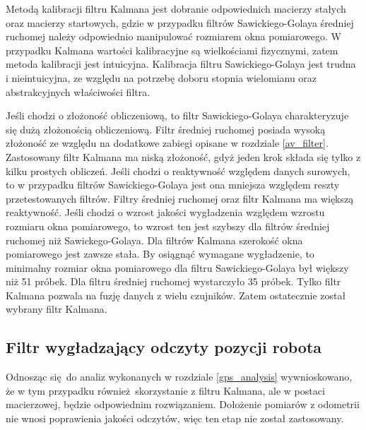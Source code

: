 {{        Metodą kalibracji filtru Kalmana jest dobranie odpowiednich macierzy stałych oraz macierzy startowych, gdzie w przypadku filtrów Sawickiego-Golaya średniej ruchomej należy odpowiednio manipulować rozmiarem okna pomiarowego. W przypadku Kalmana wartości kalibracyjne są wielkościami fizycznymi, zatem metoda kalibracji jest intuicyjna. Kalibracja filtru Sawickiego-Golaya jest trudna i nieintuicyjna, ze względu na potrzebę doboru stopnia wielomianu oraz abstrakcyjnych właściwości filtra.

        Jeśli chodzi o złożoność obliczeniową, to filtr Sawickiego-Golaya charakteryzuje się dużą złożonością obliczeniową. Filtr średniej ruchomej posiada wysoką złożoność ze względu na dodatkowe zabiegi opisane w rozdziale \ref{av_filter}. Zastosowany filtr Kalmana ma niską złożoność, gdyż jeden krok składa się tylko z kilku prostych obliczeń. 
        Jeśli chodzi o reaktywność względem danych surowych, to w przypadku filtrów Sawickiego-Golaya jest ona mniejsza względem reszty przetestowanych filtrów. Filtry średniej ruchomej oraz filtr Kalmana ma większą reaktywność. 
        Jeśli chodzi o wzrost jakości wygładzenia względem wzrostu rozmiaru okna pomiarowego, to wzrost ten jest szybszy dla filtrów średniej ruchomej niż Sawickego-Golaya. Dla filtrów Kalmana szerokość okna pomiarowego jest zawsze stała.
        By osiągnąć wymagane wygładzenie, to minimalny rozmiar okna pomiarowego dla filtru Sawickiego-Golaya był większy niż 51 próbek. Dla filtru średniej ruchomej wystarczyło 35 próbek.
        Tylko filtr Kalmana pozwala na fuzję danych z wielu czujników.
        Zatem ostatecznie został wybrany filtr Kalmana.
    }
    \subsection{Filtr wygładzający odczyty pozycji robota}
    {
        Odnosząc się do analiz wykonanych w rozdziale \ref{gps_analysis} wywnioskowano, że w tym przypadku również skorzystanie z filtru Kalmana, ale w postaci macierzowej, będzie odpowiednim rozwiązaniem. Dołożenie pomiarów z odometrii nie wnosi poprawienia jakości odczytów, więc ten etap nie został zastosowany.
    }
}